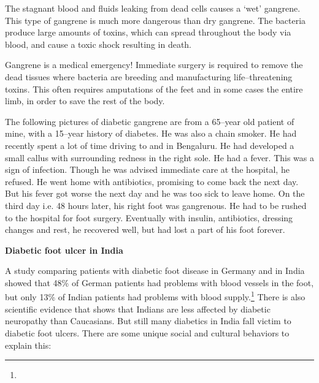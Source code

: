 {The stagnant blood and fluids leaking from dead cells causes a ‘wet’ gangrene. This type of gangrene is much more dangerous than dry gangrene. The bacteria produce large amounts of toxins, which can spread throughout the body via blood, and cause a toxic shock resulting in death.

Gangrene is a medical emergency! Immediate surgery is required to remove the dead tissues where bacteria are breeding and manufacturing life–threatening toxins. This often requires amputations of the feet and in some cases the entire limb, in order to save the rest of the body.

The following pictures of diabetic gangrene are from a 65–year old patient of mine, with a 15–year history of diabetes. He was also a chain smoker. He had recently spent a lot of time driving to and in Bengaluru. He had developed a small callus with surrounding redness in the right sole. He had a fever. This was a sign of infection. Though he was advised immediate care at the hospital, he refused. He went home with antibiotics, promising to come back the next day. But his fever got worse the next day and he was too sick to leave home. On the third day i.e. 48 hours later, his right foot was gangrenous. He had to be rushed to the hospital for foot surgery. Eventually with insulin, antibiotics, dressing changes and rest, he recovered well, but had lost a part of his foot forever.

\textbf{Diabetic foot ulcer in India}

A study comparing patients with diabetic foot disease in Germany and in India showed that 48\% of German patients had problems with blood vessels in the foot, but only 13\% of Indian patients had problems with blood supply.\footnote{} There is also scientific evidence that shows that Indians are less affected by diabetic neuropathy than Caucasians. But still many diabetics in India fall victim to diabetic foot ulcers. There are some unique social and cultural behaviors to explain this:

}
